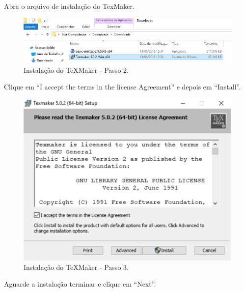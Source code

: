 \newpage
Abra o arquivo de instalação do TexMaker.

\begin{figure}[htb]
  \begin{center}
    \includegraphics[scale=0.5]{imagens/texmaker/texmaker2.png}
  \end{center}
  \caption{Instalação do TeXMaker - Passo 2.}
  \label{tmk2}
\end{figure}

Clique em “I accept the terms in the license Agreement” e depois em “Install”.

\begin{figure}[htb]
  \begin{center}
    \includegraphics[scale=0.3]{imagens/texmaker/texmaker3.png}
  \end{center}
  \caption{Instalação do TeXMaker - Passo 3.}
  \label{tmk3}
\end{figure}

Aguarde a instalação terminar e clique em “Next”.


